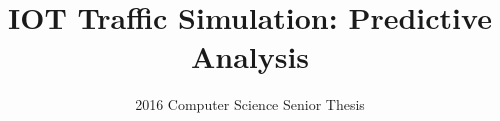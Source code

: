 \documentclass{vldb}
\begin{document}

\title{IOT Traffic Simulation: {\ttlit Predictive Analysis}}
\subtitle{2016 Computer Science Senior Thesis}



%
%
%
%

\end{document}
